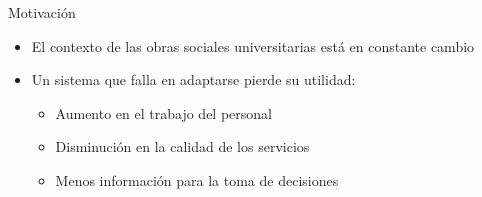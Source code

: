 \documentclass[10pt]{beamer}
\begin{document}
\begin{frame}{Motivación}
    \begin{itemize}
        \item El contexto de las obras sociales universitarias está en constante cambio
        \item Un sistema que falla en adaptarse pierde su utilidad:
        \begin{itemize}
            \item Aumento en el trabajo del personal
            \item Disminución en la calidad de los servicios
            \item Menos información para la toma de decisiones
        \end{itemize}
    \end{itemize}
\end{frame}

\end{document}
